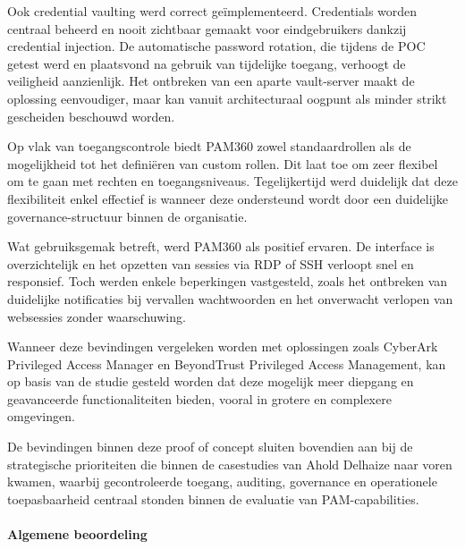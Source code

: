 Ook credential vaulting werd correct geïmplementeerd. Credentials worden centraal beheerd en nooit zichtbaar gemaakt voor eindgebruikers dankzij credential injection. De automatische password rotation, die tijdens de POC getest werd en plaatsvond na gebruik van tijdelijke toegang, verhoogt de veiligheid aanzienlijk. Het ontbreken van een aparte vault-server maakt de oplossing eenvoudiger, maar kan vanuit architecturaal oogpunt als minder strikt gescheiden beschouwd worden.

Op vlak van toegangscontrole biedt PAM360 zowel standaardrollen als de mogelijkheid tot het definiëren van custom rollen. Dit laat toe om zeer flexibel om te gaan met rechten en toegangsniveaus. Tegelijkertijd werd duidelijk dat deze flexibiliteit enkel effectief is wanneer deze ondersteund wordt door een duidelijke governance-structuur binnen de organisatie.

Wat gebruiksgemak betreft, werd PAM360 als positief ervaren. De interface is overzichtelijk en het opzetten van sessies via RDP of SSH verloopt snel en responsief. Toch werden enkele beperkingen vastgesteld, zoals het ontbreken van duidelijke notificaties bij vervallen wachtwoorden en het onverwacht verlopen van websessies zonder waarschuwing.

Wanneer deze bevindingen vergeleken worden met oplossingen zoals CyberArk Privileged Access Manager en BeyondTrust Privileged Access Management, kan op basis van de studie gesteld worden dat deze mogelijk meer diepgang en geavanceerde functionaliteiten bieden, vooral in grotere en complexere omgevingen. 

De bevindingen binnen deze proof of concept sluiten bovendien aan bij de strategische prioriteiten die binnen de casestudies van Ahold Delhaize naar voren kwamen, waarbij gecontroleerde toegang, auditing, governance en operationele toepasbaarheid centraal stonden binnen de evaluatie van PAM-capabilities.
\paragraph{Algemene beoordeling}

